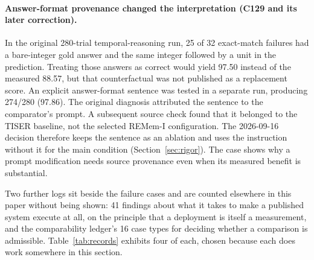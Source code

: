 \paragraph{Answer-format provenance changed the interpretation (C129 and its later correction).}
In the original 280-trial temporal-reasoning run, 25 of 32 exact-match failures had a bare-integer
gold answer and the same integer followed by a unit in the prediction. Treating those answers as
correct would yield 97.50 instead of the measured 88.57, but that counterfactual was not published
as a replacement score. An explicit answer-format sentence was tested in a separate run,
producing 274/280 (97.86). The original diagnosis attributed the sentence to the comparator's
prompt. A subsequent source check found that it belonged to the TISER baseline, not the selected
REMem-I configuration. The 2026-09-16 decision therefore keeps the sentence as an ablation and
uses the instruction without it for the main condition (Section~\ref{sec:rigor}). The case shows
why a prompt modification needs source provenance even when its measured benefit is substantial.

Two further logs sit beside the failure cases and are counted elsewhere in this paper without
being shown: 41 findings about what it takes to make a published system execute at all, on the
principle that a deployment is itself a measurement, and the comparability ledger's 16 case types
for deciding whether a comparison is admissible. Table~\ref{tab:records} exhibits four of each,
chosen because each does work somewhere in this section.

